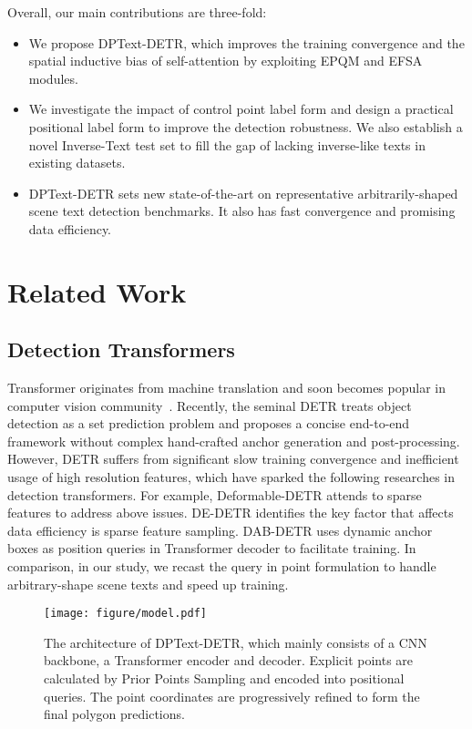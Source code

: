 \documentclass[letterpaper]{article} \usepackage{aaai23}  \usepackage{times}  \usepackage{helvet}  \usepackage{courier}  \usepackage[hyphens]{url}  \usepackage{graphicx} \urlstyle{rm}
\begin{document}
Overall, our main contributions are three-fold:
\begin{itemize}
\item We propose DPText-DETR, which improves the training convergence and the spatial inductive bias of self-attention by exploiting EPQM and EFSA modules.
\item We investigate the impact of control point label form and design a practical positional label form to improve the detection robustness. We also establish a novel Inverse-Text test set to fill the gap of lacking inverse-like texts in existing datasets.
\item DPText-DETR sets new state-of-the-art on representative arbitrarily-shaped scene text detection benchmarks. It also has fast convergence and promising data efficiency. 
\end{itemize}



\section{Related Work}
\subsection{Detection Transformers}
Transformer \cite{vaswani2017attention} originates from machine translation and soon becomes popular in computer vision community~\cite{dosovitskiy2020image,liu2021swin,xu2021vitae,zhang2022vitaev2,zhang2022vsa}. Recently, the seminal DETR \cite{carion2020end} treats object detection as a set prediction problem and proposes a concise end-to-end framework without complex hand-crafted anchor generation and post-processing. However, DETR suffers from significant slow training convergence and inefficient usage of high resolution features, which have sparked the following researches in detection transformers. For example, Deformable-DETR \cite{zhu2020deformable} attends to sparse features to address above issues. DE-DETR \cite{wang2022towards} identifies the key factor that affects data efficiency is sparse feature sampling. 
DAB-DETR \cite{liu2022dabdetr} uses dynamic anchor boxes as position queries in Transformer decoder to facilitate training. In comparison, in our study, we recast the query in point formulation to handle arbitrary-shape scene texts and speed up training.

\begin{figure*}[!ht]
    \centering
    \texttt{[image: figure/model.pdf]}
    \caption{The architecture of DPText-DETR, which mainly consists of a CNN backbone, a Transformer encoder and decoder. Explicit points are calculated by Prior Points Sampling and encoded into positional queries. The point coordinates are progressively refined to form the final polygon predictions.}
    \label{fig:model}
\end{figure*}
\end{document}
